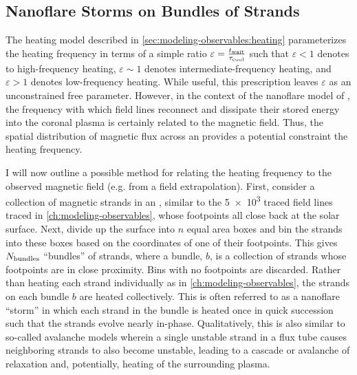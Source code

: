 \subsection{Nanoflare Storms on Bundles of Strands}\label{sec:bundle}

The heating model described in \autoref{sec:modeling-observables:heating} parameterizes the heating frequency in terms of a simple ratio $\varepsilon=\frac{t_{\textup{wait}}}{\tau_\textup{cool}}$ such that $\varepsilon<1$ denotes to high-frequency heating, $\varepsilon\sim1$ denotes intermediate-frequency heating, and $\varepsilon>1$ denotes low-frequency heating. While useful, this prescription leaves $\varepsilon$ as an unconstrained free parameter. However, in the context of the nanoflare model of \citet[see \autoref{sec:nanoflares}]{parker_nanoflares_1988}, the frequency with which field lines reconnect and dissipate their stored energy into the coronal plasma is certainly related to the magnetic field. Thus, the spatial distribution of magnetic flux across an \AR{} provides a potential constraint the heating frequency.

I will now outline a possible method for relating the heating frequency to the observed magnetic field (e.g. from a field extrapolation). First, consider a collection of magnetic strands in an \AR{}, similar to the \num{5e3} traced field lines traced in \autoref{ch:modeling-observables}, whose footpoints all close back at the solar surface. Next, divide up the surface into $n$ equal area boxes and bin the strands into these boxes based on the coordinates of one of their footpoints. This gives $N_\textup{bundles}$ ``bundles'' of strands, where a bundle, $b$, is a collection of strands whose footpoints are in close proximity. Bins with no footpoints are discarded. Rather than heating each strand individually as in \autoref{ch:modeling-observables}, the strands on each bundle $b$ are heated collectively. This is often referred to as a nanoflare ``storm'' in which each strand in the bundle is heated once in quick succession \citep{klimchuk_key_2015,schmelz_what_2015,mulu-moore_can_2011} such that the strands evolve nearly in-phase. Qualitatively, this is also similar to so-called avalanche models \citep[e.g.][]{hood_mhd_2016} wherein a single unstable strand in a flux tube causes neighboring strands to also become unstable, leading to a cascade or avalanche of relaxation and, potentially, heating of the surrounding plasma.

